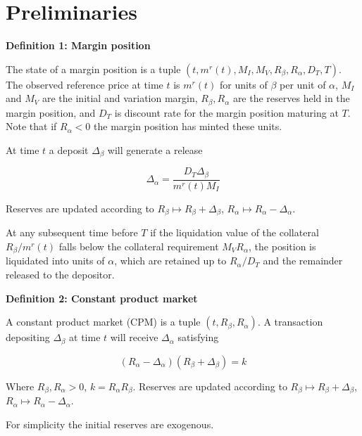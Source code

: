 \documentclass[12pt]{article}
\begin{document}

\section{Preliminaries}

\textbf{Definition 1: Margin position}

The state of a margin position is a tuple $(t, m^r(t), M_I, M_V, R_\beta, R_\alpha, D_T, T)$. The observed reference price at time $t$ is $m^r(t)$ for units of $\beta$ per unit of $\alpha$, $M_I$ and $M_V$ are the initial and variation margin, $R_\beta, R_\alpha$ are the reserves held in the margin position, and $D_T$ is discount rate for the margin position maturing at $T$. Note that if $R_\alpha<0$ the margin position has minted these units.

At time $t$ a deposit $\Delta_\beta$  will generate a release 

\[\Delta_\alpha = \frac{D_T \Delta_\beta}{m^r(t) M_I }\]

Reserves are updated according to $R_\beta \mapsto R_\beta + \Delta_\beta$, $R_\alpha \mapsto R_\alpha - \Delta_\alpha$. 

At any subsequent time before $T$ if the liquidation value of the collateral $R_\beta/m^r(t)$ falls below the collateral requirement $M_V R_\alpha$, the position is liquidated into units of $\alpha$, which are retained up to $R_\alpha/D_T$ and the remainder released to the depositor.   


\textbf{Definition 2: Constant product market}

A constant product market (CPM) is a tuple $(t, R_\beta, R_\alpha)$. A transaction depositing $\Delta_\beta$ at time $t$ will receive $\Delta_\alpha$ satisfying

\[(R_\alpha - \Delta_\alpha)(R_\beta + \Delta_\beta) = k\]

Where $R_\beta,R_\alpha >0$,  $k=R_\alpha R_\beta$. Reserves are updated according to $R_\beta \mapsto R_\beta + \Delta_\beta$, $R_\alpha \mapsto R_\alpha - \Delta_\alpha$.

For simplicity the initial reserves are exogenous.
\end{document}
